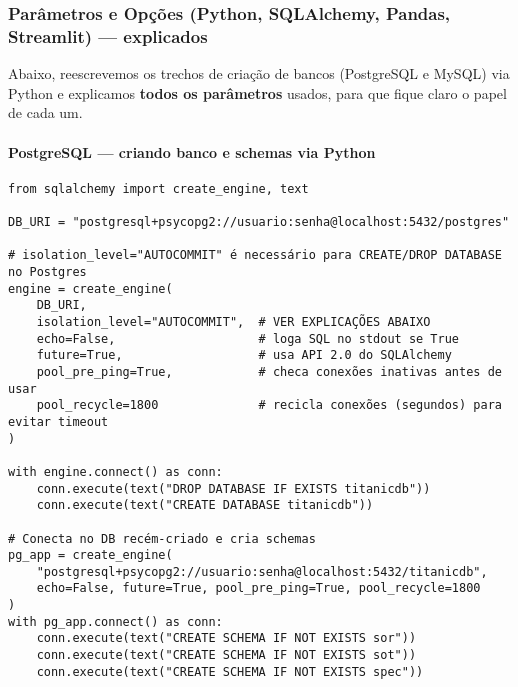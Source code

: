 \documentclass[12pt,a4paper]{article}
\begin{document}
\subsubsection*{Parâmetros e Opções (Python, SQLAlchemy, Pandas, Streamlit) — explicados}

Abaixo, reescrevemos os trechos de criação de bancos (PostgreSQL e MySQL) via Python e explicamos \textbf{todos os parâmetros} usados, para que fique claro o papel de cada um.

\paragraph{PostgreSQL — criando banco e schemas via Python}
\begin{verbatim}
from sqlalchemy import create_engine, text

DB_URI = "postgresql+psycopg2://usuario:senha@localhost:5432/postgres"

# isolation_level="AUTOCOMMIT" é necessário para CREATE/DROP DATABASE no Postgres
engine = create_engine(
    DB_URI,
    isolation_level="AUTOCOMMIT",  # VER EXPLICAÇÕES ABAIXO
    echo=False,                    # loga SQL no stdout se True
    future=True,                   # usa API 2.0 do SQLAlchemy
    pool_pre_ping=True,            # checa conexões inativas antes de usar
    pool_recycle=1800              # recicla conexões (segundos) para evitar timeout
)

with engine.connect() as conn:
    conn.execute(text("DROP DATABASE IF EXISTS titanicdb"))
    conn.execute(text("CREATE DATABASE titanicdb"))

# Conecta no DB recém-criado e cria schemas
pg_app = create_engine(
    "postgresql+psycopg2://usuario:senha@localhost:5432/titanicdb",
    echo=False, future=True, pool_pre_ping=True, pool_recycle=1800
)
with pg_app.connect() as conn:
    conn.execute(text("CREATE SCHEMA IF NOT EXISTS sor"))
    conn.execute(text("CREATE SCHEMA IF NOT EXISTS sot"))
    conn.execute(text("CREATE SCHEMA IF NOT EXISTS spec"))
\end{verbatim}
\end{document}
